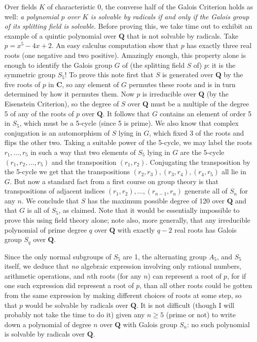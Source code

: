 \documentclass[10pt]{article}
\begin{document}
Over fields $K$ of characteristic 0, the converse half of the Galois
Criterion holds as well: {\sl a polynomial $p$ over $K$ is solvable by
  radicals if and only if the Galois group of its splitting field is
  solvable}. Before proving this, we take time out to exhibit an example
of a quintic polynomial over $\mathbf Q$ that is not solvable by
radicals. Take $p= x^5 - 4x + 2$. An easy calculus computation show that
$p$ has exactly three real roots (one negative and two positive).
Amazingly enough, this property alone is enough to identify the Galois
group $G$ of (the splitting field $S$ of) $p$: it is the symmetric group
$S_5$! To prove this note first that $S$ is generated over $\mathbf Q$
by the five roots of $p$ in $\mathbf C$, so any element of $G$ permutes
these roots and is in turn determined by how it permutes them. Now $p$
is irreducible over $\mathbf Q$ (by the Eisenstein Criterion), so the
degree of $S$ over $\mathbf Q$ must be a multiple of the degree 5 of any
of the roots of $p$ over $\mathbf Q$. It follows that $G$ contains an
element of order 5 in $S_5$, which must be a 5-cycle (since 5 is prime).
We also know that complex conjugation is an automorphism of $S$ lying in
$G$, which fixed 3 of the roots and flips the other two. Taking a
suitable power of the 5-cycle, we may label the roots $r_1,\ldots,r_5$
in such a way that two elements of $S_5$ lying in $G$ are the 5-cycle
$(r_1, r_2,\ldots,r_5)$ and the transposition $(r_1,r_2)$. Conjugating
the transposition by the 5-cycle we get that the transpositions
$(r_2,r_3),(r_3,r_4),(r_4,r_5)$ all lie in $G$. But now a standard fact
from a first course on group theory is that transpositions of adjacent
indices $(r_1,r_2),\ldots,(r_{n-1},r_n)$ generate all of $S_n$ for any
$n$. We conclude that $S$ has the maximum possible degree of 120 over
$\mathbf Q$ and that $G$ is all of $S_5$, as claimed. Note that it would
be essentially impossible to prove this using field theory alone; note
also, more generally, that any irreducible polynomial of prime degree
$q$ over $\mathbf Q$ with exactly $q-2$ real roots has Galois group
$S_q$ over $\mathbf Q$.

Since the only normal subgroups of $S_5$ are 1, the alternating group
$A_5$, and $S_5$ itself, we deduce that {\sl no} algebraic expression
involving only rational numbers, arithmetic operations, and $n$th roots
(for any $n$) can represent a root of $p$, for if one such expression
did represent a root of $p$, than all other roots could be gotten from
the same expression by making different choices of roots at some step,
so that $p$ would be solvable by radicals over $\mathbf Q$. It is not
difficult (though I will probably not take the time to do it) given any
$n\ge5$ (prime or not) to write down a polynomial of degree $n$ over
$\mathbf Q$ with Galois group $S_n$: no such polynomial is solvable by
radicals over $\mathbf Q$.
\end{document}
